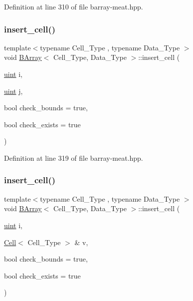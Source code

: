 Definition at line 310 of file barray-\/meat.\+hpp.

\mbox{\label{class_b_array_a4deb6afa6040603fc4fb5a90eef90761}} 
\subsubsection{\texorpdfstring{insert\+\_\+cell()}{insert\_cell()}\hspace{0.1cm}{\footnotesize\ttfamily [3/10]}}
{\footnotesize\ttfamily template$<$typename Cell\+\_\+\+Type , typename Data\+\_\+\+Type $>$ \\
void \hyperlink{class_b_array}{B\+Array}$<$ Cell\+\_\+\+Type, Data\+\_\+\+Type $>$\+::insert\+\_\+cell (\begin{DoxyParamCaption}\item[{\hyperlink{typedefs_8hpp_a91ad9478d81a7aaf2593e8d9c3d06a14}{uint}}]{i,  }\item[{\hyperlink{typedefs_8hpp_a91ad9478d81a7aaf2593e8d9c3d06a14}{uint}}]{j,  }\item[{bool}]{check\+\_\+bounds = {\ttfamily true},  }\item[{bool}]{check\+\_\+exists = {\ttfamily true} }\end{DoxyParamCaption})\hspace{0.3cm}{\ttfamily [inline]}}



Definition at line 319 of file barray-\/meat.\+hpp.

\mbox{\label{class_b_array_ac631a7a4b7308b00073a5e521d548933}} 
\subsubsection{\texorpdfstring{insert\+\_\+cell()}{insert\_cell()}\hspace{0.1cm}{\footnotesize\ttfamily [4/10]}}
{\footnotesize\ttfamily template$<$typename Cell\+\_\+\+Type , typename Data\+\_\+\+Type $>$ \\
void \hyperlink{class_b_array}{B\+Array}$<$ Cell\+\_\+\+Type, Data\+\_\+\+Type $>$\+::insert\+\_\+cell (\begin{DoxyParamCaption}\item[{\hyperlink{typedefs_8hpp_a91ad9478d81a7aaf2593e8d9c3d06a14}{uint}}]{i,  }\item[{\hyperlink{class_cell}{Cell}$<$ Cell\+\_\+\+Type $>$ \&}]{v,  }\item[{bool}]{check\+\_\+bounds = {\ttfamily true},  }\item[{bool}]{check\+\_\+exists = {\ttfamily true} }\end{DoxyParamCaption})\hspace{0.3cm}{\ttfamily [inline]}}



